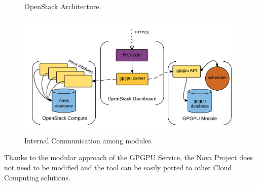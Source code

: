 \documentclass[a4paper,twoside]{article}
\begin{document}
\begin{figure}[htb]
  \centering
   \quad
  \caption{OpenStack Architecture.}
  \label{fig:os}
\end{figure}

\begin{figure}[htb]
  \centering
  \includegraphics[width=\linewidth]{images/os2.png}
  \caption{Internal Communication among modules.}
  \label{fig:internal}
\end{figure}

Thanks to the modular approach of the GPGPU Service, the Nova Project does not need to be modified and the tool can be easily ported to other Cloud Computing solutions.
\end{document}
